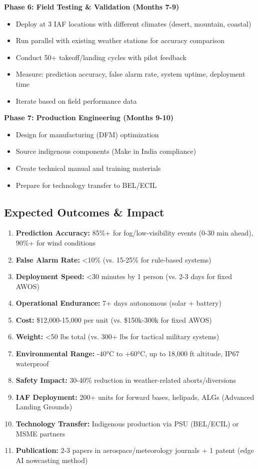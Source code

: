 \textbf{Phase 6: Field Testing \& Validation (Months 7-9)}
\begin{itemize}
    \item Deploy at 3 IAF locations with different climates (desert, mountain, coastal)
    \item Run parallel with existing weather stations for accuracy comparison
    \item Conduct 50+ takeoff/landing cycles with pilot feedback
    \item Measure: prediction accuracy, false alarm rate, system uptime, deployment time
    \item Iterate based on field performance data
\end{itemize}

\textbf{Phase 7: Production Engineering (Months 9-10)}
\begin{itemize}
    \item Design for manufacturing (DFM) optimization
    \item Source indigenous components (Make in India compliance)
    \item Create technical manual and training materials
    \item Prepare for technology transfer to BEL/ECIL
\end{itemize}

\subsection{Expected Outcomes \& Impact}

\begin{enumerate}[leftmargin=*]
    \item \textbf{Prediction Accuracy:} 85\%+ for fog/low-visibility events (0-30 min ahead), 90\%+ for wind conditions
    \item \textbf{False Alarm Rate:} <10\% (vs. 15-25\% for rule-based systems)
    \item \textbf{Deployment Speed:} <30 minutes by 1 person (vs. 2-3 days for fixed AWOS)
    \item \textbf{Operational Endurance:} 7+ days autonomous (solar + battery)
    \item \textbf{Cost:} \$12,000-15,000 per unit (vs. \$150k-300k for fixed AWOS)
    \item \textbf{Weight:} <50 lbs total (vs. 300+ lbs for tactical military systems)
    \item \textbf{Environmental Range:} -40°C to +60°C, up to 18,000 ft altitude, IP67 waterproof
    \item \textbf{Safety Impact:} 30-40\% reduction in weather-related aborts/diversions
    \item \textbf{IAF Deployment:} 200+ units for forward bases, helipads, ALGs (Advanced Landing Grounds)
    \item \textbf{Technology Transfer:} Indigenous production via PSU (BEL/ECIL) or MSME partners
    \item \textbf{Publication:} 2-3 papers in aerospace/meteorology journals + 1 patent (edge AI nowcasting method)
\end{enumerate}

